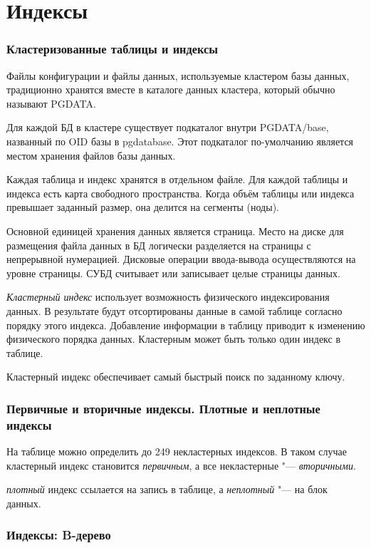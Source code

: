 \part{Индексы}

\section{Кластеризованные таблицы и индексы}

Файлы конфигурации и файлы данных, используемые кластером базы данных, традиционно хранятся вместе в каталоге данных кластера, который обычно называют PGDATA.

Для каждой БД в кластере существует подкаталог внутри PGDATA/base, названный по OID базы в pg\textunderscore database.
Этот подкаталог по-умолчанию является местом хранения файлов базы данных.

Каждая таблица и индекс хранятся в отдельном файле.
Для каждой таблицы и индекса есть карта свободного пространства.
Когда объём таблицы или индекса превышает заданный размер, она делится на сегменты (ноды).

Основной единицей хранения данных является страница.
Место на диске для размещения файла данных в БД логически разделяется на страницы с непрерывной нумерацией.
Дисковые операции ввода-вывода осуществляются на уровне страницы.
СУБД считывает или записывает целые страницы данных.

\emph{Кластерный индекс} использует возможность физического индексирования данных.
В результате будут отсортированы данные в самой таблице согласно порядку этого индекса.
Добавление информации в таблицу приводит к изменению физического порядка данных.
Кластерным может быть только один индекс в таблице.

Кластерный индекс обеспечивает самый быстрый поиск по заданному ключу.

\section{Первичные и вторичные индексы. Плотные и неплотные индексы}

На таблице можно определить до 249 некластерных индексов.
В таком случае кластерный индекс становится \emph{первичным}, а все некластерные "--- \emph{вторичными}.

 \emph{плотный} индекс ссылается на запись в таблице, а \emph{неплотный} "--- на блок данных.

\section{Индексы: B-дерево}

